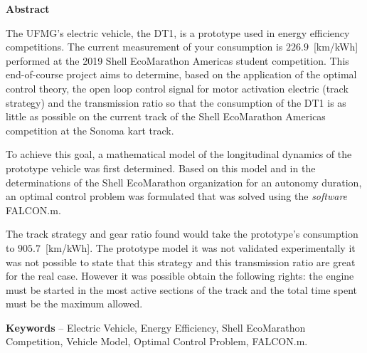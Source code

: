 
\begin{center}
\huge{{\bf Abstract}}
\vspace{2cm}
\end{center}

The UFMG's electric vehicle, the DT1, is a prototype used in energy efficiency competitions.
The current measurement of your consumption is $226.9$~[km/kWh] performed at the 2019 Shell EcoMarathon Americas student competition.
This end-of-course project aims to determine, based on the application of the optimal control theory, the open loop control signal for motor activation
electric (track strategy) and the transmission ratio so that the consumption of the DT1 is as little as possible on the current track of the Shell EcoMarathon Americas competition at the Sonoma kart track.

To achieve this goal, a mathematical model of the longitudinal dynamics of the prototype vehicle was first determined. Based on this model
and in the determinations of the Shell EcoMarathon organization for an autonomy duration, an optimal control problem was formulated that was solved using the
\textit{software} FALCON.m.

The track strategy and gear ratio found would take the prototype's consumption to $905.7$~[km/kWh]. The prototype model
it was not validated experimentally it was not possible to state that this strategy and this transmission ratio are great for the real case. However it was possible
obtain the following rights: the engine must be started in the most active sections of the track and the total time spent must be the maximum allowed.

\textbf{Keywords} -- Electric Vehicle, Energy Efficiency, Shell EcoMarathon Competition, Vehicle Model, Optimal Control Problem, FALCON.m.

 
\clearpage
\thispagestyle{empty}
\cleardoublepage

